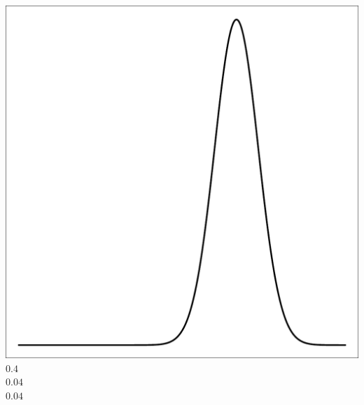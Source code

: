 \documentclass{beamer}
\begin{document}
\begin{frame}[t]
\begin{columns}[c]
\begin{flushright}
                \includegraphics[width=1\textwidth]{bayesian_update_illustration_th3.pdf}\\
                \vspace{10pt}
                \Large $0.4$\\
                \vspace{20pt}
                \Large $0.04$\\
                \vspace{20pt}
                \Large $0.04$
            \end{flushright}
    \end{columns}
\end{frame}
\end{document}
